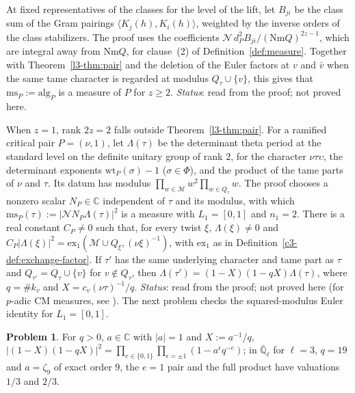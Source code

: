 \documentclass[reqno]{amsart}
\theoremstyle{definition}
\newtheorem{problem}{Problem}[section]
\theoremstyle{plain}
\theoremstyle{remark}
\newcommand{\C}{\mathbb{C}}
\newcommand{\Ql}{\bar{\mathbb{Q}}_\ell}
\newcommand{\Mcal}{\mathcal{M}}
\newcommand{\Nc}{\mathcal{N}}
\newcommand{\ms}{\mathrm{ms}}
\newcommand{\alg}{\mathrm{alg}}
\newcommand{\Nm}{\mathrm{Nm}}
\begin{document}
At fixed representatives of the classes for the level of the lift, let \(B_{ji}\) be the class sum of the Gram pairings \(\langle K_j(h), K_i(h)\rangle\), weighted by the inverse orders of the class stabilizers.  The proof uses the coefficients \(\Nc\,d_P^2 B_{ji}/(\Nm Q)^{2z-1}\), which are integral away from \(\Nm Q\), for clause~(2) of Definition~\ref{def:measure}.  Together with Theorem~\ref{l3-thm:pair} and the deletion of the Euler factors at \(v\) and \(\bar v\) when the same tame character is regarded at modulus \(Q_\tau \cup \{v\}\), this gives that \(\ms_P := \alg_P\) is a measure of \(P\) for \(z \ge 2\).  \emph{Status}: read from the proof; not proved here.

When \(z = 1\), rank \(2z = 2\) falls outside Theorem~\ref{l3-thm:pair}.  For a ramified critical pair \(P = (\nu, 1)\), let \(\Lambda(\tau)\) be the determinant theta period at the standard level on the definite unitary group of rank \(2\), for the character \(\nu\tau\upsilon\), the determinant exponents \(\mathrm{wt}_P(\sigma) - 1\) (\(\sigma \in \Phi\)), and the product of the tame parts of \(\nu\) and \(\tau\).  Its datum has modulus \(\prod_{w \in \Mcal} w^2 \prod_{w \in Q_\tau} w\).  The proof chooses a nonzero scalar \(N_P \in \C\) independent of \(\tau\) and its modulus, with which \(\ms_P(\tau) := \lvert\Nc N_P \Lambda(\tau)\rvert^2\) is a measure with \(L_1 = [0, 1]\) and \(n_1 = 2\).  There is a real constant \(C_P \ne 0\) such that, for every twist \(\xi\), \(\Lambda(\xi) \ne 0\) and \(C_P\lvert\Lambda(\xi)\rvert^2 = \mathrm{ex}_1(\Mcal \cup Q_\xi, (\nu\xi)^{-1})\), with \(\mathrm{ex}_1\) as in Definition~\ref{c3-def:exchange-factor}.  If \(\tau'\) has the same underlying character and tame part as \(\tau\) and \(Q_{\tau'} = Q_\tau \cup \{v\}\) for \(v \notin Q_\tau\), then \(\Lambda(\tau') = (1 - X)(1 - qX)\Lambda(\tau)\), where \(q = \#k_v\) and \(X = c_v(\nu\tau)^{-1}/q\).  \emph{Status}: read from the proof; not proved here (for \(p\)-adic CM measures, see \cite{Ka,Hi}).  The next problem checks the squared-modulus Euler identity for \(L_1 = [0, 1]\).

\begin{problem}\label{pr:z-one}
For \(q > 0\), \(a \in \C\) with \(\lvert a\rvert = 1\) and \(X := a^{-1}/q\), \(\lvert (1 - X)(1 - qX)\rvert^2 = \prod_{e \in \{0, 1\}} \prod_{\epsilon = \pm 1} (1 - a^{\epsilon} q^{-e})\); in \(\Ql\) for \(\ell = 3\), \(q = 19\) and \(a = \zeta_9\) of exact order \(9\), the \(e = 1\) pair and the full product have valuations \(1/3\) and \(2/3\).
\end{problem}
\end{document}
